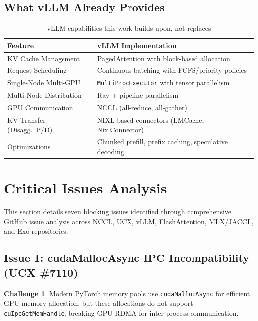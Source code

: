 \documentclass[11pt,letterpaper]{article}
\theoremstyle{definition}
\newtheorem{challenge}{Challenge}
\begin{document}
\subsection{What vLLM Already Provides}

\begin{table}[htbp]
\centering
\caption{vLLM capabilities this work builds upon, not replaces}
\label{tab:vllm-capabilities}
\begin{tabular}{@{}ll@{}}
\toprule
\textbf{Feature} & \textbf{vLLM Implementation} \\
\midrule
KV Cache Management & PagedAttention with block-based allocation \\
Request Scheduling & Continuous batching with FCFS/priority policies \\
Single-Node Multi-GPU & \texttt{MultiProcExecutor} with tensor parallelism \\
Multi-Node Distribution & Ray + pipeline parallelism \\
GPU Communication & NCCL (all-reduce, all-gather) \\
KV Transfer (Disagg.\ P/D) & NIXL-based connectors (LMCache, NixlConnector) \\
Optimizations & Chunked prefill, prefix caching, speculative decoding \\
\bottomrule
\end{tabular}
\end{table}

\section{Critical Issues Analysis}
\label{sec:critical-issues}

This section details seven blocking issues identified through comprehensive GitHub issue analysis across NCCL, UCX, vLLM, FlashAttention, MLX/JACCL, and Exo repositories.

\subsection{Issue 1: cudaMallocAsync IPC Incompatibility (UCX \#7110)}

\begin{challenge}
Modern PyTorch memory pools use \texttt{cudaMallocAsync} for efficient GPU memory allocation, but these allocations do not support \texttt{cuIpcGetMemHandle}, breaking GPU RDMA for inter-process communication.
\end{challenge}
\end{document}
